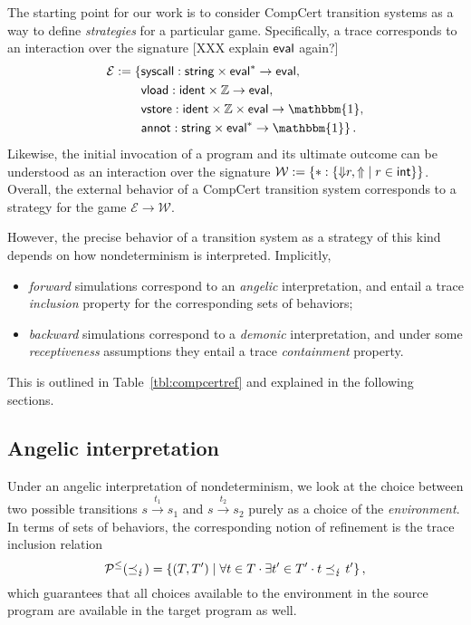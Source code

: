 \documentclass[sigplan,10pt,authordraft]{acmart}
\newcommand{\bdot}{\cdot}
\begin{document}
The starting point for our work
is to consider CompCert transition systems
as a way to define \emph{strategies}
for a particular game.
Specifically,
a trace corresponds to an interaction
over the signature
[XXX explain $ \mathsf{eval} $ again?]
\begin{align*}
  \mathcal{E} := \{ {}
    &\kw{syscall} :
      \kw{string} \times \kw{eval}^* \rightarrow \kw{eval},
      \\
    &\kw{vload} :
      \kw{ident} \times \mathbb{Z} \rightarrow \kw{eval},
      \\
    &\kw{vstore} :
      \kw{ident} \times \mathbb{Z} \times \kw{eval} \rightarrow \mathbbm{1},
      \\
    &\kw{annot} :
      \kw{string} \times \kw{eval}^* \rightarrow \mathbbm{1}
  \}
  \,.
\end{align*}
Likewise,
the initial invocation of a program
and its ultimate outcome can
be understood as an interaction over the signature
$
  \mathcal{W} := \{
    {*} : \{ {\Downarrow} r, {\Uparrow} \mid r \in  \mathsf{int}  \}
  \}
$.
Overall,
the external behavior of
a CompCert transition system
corresponds to a strategy
for the game $\mathcal{E} \rightarrow \mathcal{W}$.

However,
the precise behavior of a transition system
as a strategy of this kind
depends on how nondeterminism is interpreted.
Implicitly,
\begin{itemize}
  \item
    \emph{forward} simulations
    correspond to an \emph{angelic} interpretation,
    and entail a trace \emph{inclusion} property
    for the corresponding sets of behaviors;
  \item
    \emph{backward} simulations
    correspond to a \emph{demonic} interpretation, and
    under some \emph{receptiveness} assumptions
    they entail a trace \emph{containment} property.
\end{itemize}
This is outlined in Table~\ref{tbl:compcertref}
and explained in the following sections.


\subsection{Angelic interpretation} \label{sec:sem:fsim} %

Under an angelic interpretation of nondeterminism,
we look at the choice between two possible transitions
$
  s \stackrel{t_1}{\longrightarrow} s_1
$
and
$
  s \stackrel{t_2}{\longrightarrow} s_2
$
purely as a choice of the \emph{environment}.
In terms of sets of behaviors,
the corresponding notion of refinement
is the trace inclusion relation
\[
  \mathcal{P}^\le({\refby_\lightning}) =
  \{ (T, T') \mid \forall t \in T \bdot \exists t' \in T' \bdot
      t \refby_\lightning t' \}
  \,,
\]
which guarantees that
all choices available to the environment in the source program
are available in the target program as well.
\end{document}
